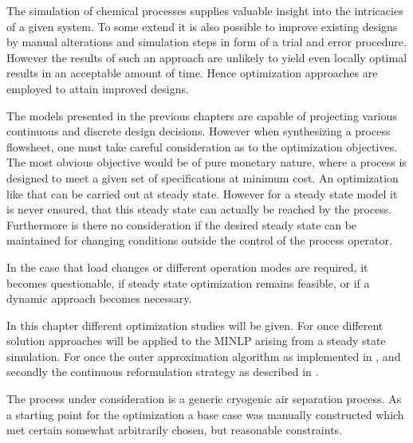 The simulation of chemical processes supplies valuable insight into the intricacies of a given system.
To some extend it is also possible to improve existing designs by manual alterations and simulation
steps in form of a trial and error procedure. However the results of such an approach are unlikely
to yield even locally optimal results in an acceptable amount of time. Hence optimization approaches
are employed to attain improved designs.

The models presented in the previous chapters are capable of projecting various continuous and
discrete design decisions. However when synthesizing a process flowsheet, one must take careful
consideration as to the optimization objectives. The most obvious objective would be of
pure monetary nature, where a process is designed to meet a given set of specifications
at minimum cost. An optimization like that can be carried out at steady state. However for
a steady state model it is never ensured, that this steady state can actually be reached
by the process. Furthermore is there no consideration if the desired steady state can be maintained for
changing conditions outside the control of the process operator.

In the case that load changes or different operation modes are required, it becomes questionable,
if steady state optimization remains feasible, or if a dynamic approach becomes necessary.

In this chapter different optimization studies will be given. For once different solution approaches
will be applied to the MINLP arising from a steady state simulation. For once the outer approximation
algorithm as implemented in \gproms, and secondly the continuous reformulation strategy as described
in .

The process under consideration is a generic cryogenic air separation process. As a starting point for the
optimization a base case was manually constructed which met certain somewhat arbitrarily chosen,
but reasonable constraints.

